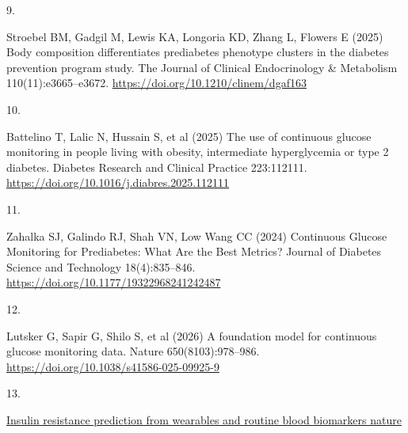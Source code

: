 \documentclass[
  12pt,
  letterpaper,
  DIV=11,
  numbers=noendperiod]{scrartcl}
\newlength{\cslhangindent}
\newlength{\csllabelwidth}
\newenvironment{CSLReferences}[2] %
 {\begin{list}{}{%
  \setlength{\itemindent}{0pt}
  \setlength{\leftmargin}{0pt}
  \setlength{\parsep}{0pt}
  \ifodd #1
   \setlength{\leftmargin}{\cslhangindent}
   \setlength{\itemindent}{-1\cslhangindent}
  \fi
  \setlength{\itemsep}{#2\baselineskip}}}
 {\end{list}}
\newcommand{\CSLLeftMargin}[1]{\parbox[t]{\csllabelwidth}{\strut#1\strut}}
\newcommand{\CSLRightInline}[1]{\parbox[t]{\linewidth - \csllabelwidth}{\strut#1\strut}}
\begin{document}
\begin{CSLReferences}{0}{1}
\CSLLeftMargin{9. }%
\CSLRightInline{Stroebel BM, Gadgil M, Lewis KA, Longoria KD, Zhang L,
Flowers E (2025) Body composition differentiates prediabetes phenotype
clusters in the diabetes prevention program study. The Journal of
Clinical Endocrinology \& Metabolism 110(11):e3665--e3672.
\url{https://doi.org/10.1210/clinem/dgaf163}}

\CSLLeftMargin{10. }%
\CSLRightInline{Battelino T, Lalic N, Hussain S, et al (2025) The use of
continuous glucose monitoring in people living with obesity,
intermediate hyperglycemia or type 2 diabetes. Diabetes Research and
Clinical Practice 223:112111.
\url{https://doi.org/10.1016/j.diabres.2025.112111}}

\CSLLeftMargin{11. }%
\CSLRightInline{Zahalka SJ, Galindo RJ, Shah VN, Low Wang CC (2024)
Continuous Glucose Monitoring for Prediabetes: What Are the Best
Metrics? Journal of Diabetes Science and Technology 18(4):835--846.
\url{https://doi.org/10.1177/19322968241242487}}

\CSLLeftMargin{12. }%
\CSLRightInline{Lutsker G, Sapir G, Shilo S, et al (2026) A foundation
model for continuous glucose monitoring data. Nature 650(8103):978--986.
\url{https://doi.org/10.1038/s41586-025-09925-9}}

\CSLLeftMargin{13. }%
\CSLRightInline{\href{https://www.nature.com/articles/s41586-026-10179-2}{Insulin
resistance prediction from wearables and routine blood biomarkers
\textbar{} nature}}

\end{CSLReferences}
\end{document}
